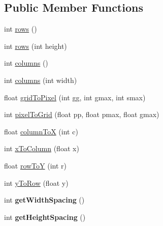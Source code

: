 \subsection*{Public Member Functions}
\begin{DoxyCompactItemize}
\item 
int \hyperlink{classdev_1_1boxy_1_1fortyfive_1_1core_1_1scene_1_1_scene_geometry_ac745864bc700ef56914b7a07a9f6ee74}{rows} ()
\item 
int \hyperlink{classdev_1_1boxy_1_1fortyfive_1_1core_1_1scene_1_1_scene_geometry_a8c66b3d085ddaec49bbe3535bd44f017}{rows} (int height)
\item 
int \hyperlink{classdev_1_1boxy_1_1fortyfive_1_1core_1_1scene_1_1_scene_geometry_aea67de0367de90842654c72bfc4b6ca5}{columns} ()
\item 
int \hyperlink{classdev_1_1boxy_1_1fortyfive_1_1core_1_1scene_1_1_scene_geometry_a361651a1028afcc9b3c51757aa1105af}{columns} (int width)
\item 
float \hyperlink{classdev_1_1boxy_1_1fortyfive_1_1core_1_1scene_1_1_scene_geometry_ab27356926b05632f408fc76cee95ba72}{gridToPixel} (int gg, int gmax, int smax)
\item 
int \hyperlink{classdev_1_1boxy_1_1fortyfive_1_1core_1_1scene_1_1_scene_geometry_aa127a8b6c4594ae0381158a0e221801e}{pixelToGrid} (float pp, float pmax, float gmax)
\item 
float \hyperlink{classdev_1_1boxy_1_1fortyfive_1_1core_1_1scene_1_1_scene_geometry_a114e87d30d346bb4196631d75760ba2a}{columnToX} (int c)
\item 
int \hyperlink{classdev_1_1boxy_1_1fortyfive_1_1core_1_1scene_1_1_scene_geometry_a1120b02b4210fcf54c236701a662342f}{xToColumn} (float x)
\item 
float \hyperlink{classdev_1_1boxy_1_1fortyfive_1_1core_1_1scene_1_1_scene_geometry_abef442c57b2cf6ec96e576e283ea91bf}{rowToY} (int r)
\item 
int \hyperlink{classdev_1_1boxy_1_1fortyfive_1_1core_1_1scene_1_1_scene_geometry_a58306b11184f35882295757504365ff7}{yToRow} (float y)
\item 
\hypertarget{classdev_1_1boxy_1_1fortyfive_1_1core_1_1scene_1_1_scene_geometry_ac140adbd2fed67810e4f8a1e47aa89af}{
int {\bfseries getWidthSpacing} ()}
\label{dd/d3e/classdev_1_1boxy_1_1fortyfive_1_1core_1_1scene_1_1_scene_geometry_ac140adbd2fed67810e4f8a1e47aa89af}

\item 
\hypertarget{classdev_1_1boxy_1_1fortyfive_1_1core_1_1scene_1_1_scene_geometry_a96eb0d39f78806fb8203b65f557d3bd7}{
int {\bfseries getHeightSpacing} ()}
\label{dd/d3e/classdev_1_1boxy_1_1fortyfive_1_1core_1_1scene_1_1_scene_geometry_a96eb0d39f78806fb8203b65f557d3bd7}

\end{DoxyCompactItemize}
